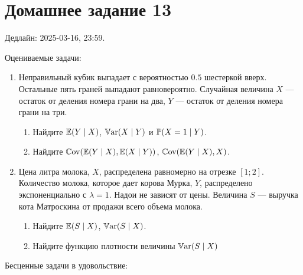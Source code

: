 \section*{Домашнее задание 13}


Дедлайн: 2025-03-16, 23:59.

Оцениваемые задачи:

\begin{enumerate}

    
\item Неправильный кубик выпадает с вероятностью $0.5$ шестеркой вверх. 
Остальные пять граней выпадают равновероятно. 
Случайная величина $X$ — остаток от деления номера грани на два, $Y$ — остаток от деления номера грани на три. 
\begin{enumerate}
\item Найдите $\E(Y\mid X)$, $\Var(X\mid Y)$ и $\P(X = 1 \mid Y)$.
\item Найдите $\Cov(\E(Y\mid X),\E(X\mid Y))$, $\Cov(\E(Y\mid X),X)$.
\end{enumerate}


\item Цена литра молока, $X$, распределена равномерно на отрезке $[1;2]$. 
Количество молока, которое дает корова Мурка, $Y$, распределено экспоненциально с $\lambda=1$. 
Надои не зависят от цены. 
Величина $S$ — выручка кота Матроскина от продажи всего объема молока.


\begin{enumerate}
\item Найдите $\E(S \mid X)$, $\Var(S \mid X)$.
\item Найдите функцию плотности величины $\Var(S \mid X)$
\end{enumerate}


\end{enumerate}

Бесценные задачи в удовольствие:

